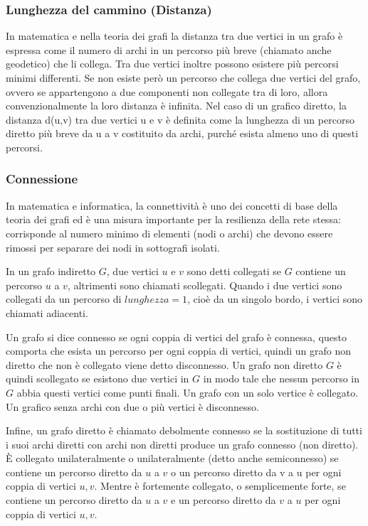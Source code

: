 \documentclass[11pt]{article}
\begin{document}
\subsubsection{Lunghezza del cammino (Distanza)}
In matematica e nella teoria dei grafi la distanza tra due vertici in un grafo è espressa come il numero di archi in un percorso più breve (chiamato anche geodetico) che li collega. \cite{GrafoDistanza}
Tra due vertici inoltre possono esistere più percorsi minimi differenti. Se non esiste però un percorso che collega due vertici del grafo, ovvero se appartengono a due componenti non collegate tra di loro, allora convenzionalmente la loro distanza è infinita.
Nel caso di un grafico diretto, la distanza d(u,v) tra due vertici u e v è definita come la lunghezza di un percorso diretto più breve da u a v costituito da archi, purché esista almeno uno di questi percorsi.

\subsubsection{Connessione}
In matematica e informatica, la connettività è uno dei concetti di base della teoria dei grafi ed è una misura importante per la resilienza della rete stessa: 
corrisponde al numero minimo di elementi (nodi o archi) che devono essere rimossi per separare dei nodi in sottografi isolati. \cite{GrafoConnettivita}

In un grafo indiretto $G$, due vertici $u$ e $v$ sono detti collegati se $G$ contiene un percorso $u$ a $v$, altrimenti sono chiamati scollegati. Quando i due vertici sono collegati da un percorso di $lunghezza = 1$, cioè da un singolo bordo, i vertici sono chiamati adiacenti.

Un grafo si dice connesso se ogni coppia di vertici del grafo è connessa, questo comporta che esista un percorso per ogni coppia di vertici, quindi un grafo non diretto che non è collegato viene detto disconnesso. Un grafo non diretto $G$ è quindi scollegato se esistono due vertici in $G$ in modo tale che nessun percorso in $G$ abbia questi vertici come punti finali. Un grafo con un solo vertice è collegato. Un grafico senza archi con due o più vertici è disconnesso.

Infine, un grafo diretto è chiamato debolmente connesso se la sostituzione di tutti i suoi archi diretti con archi non diretti produce un grafo connesso (non diretto). È collegato unilateralmente o unilateralmente (detto anche semiconnesso) se contiene un percorso diretto da $u$ a $v$ o un percorso diretto da v a u per ogni coppia di vertici $u, v$. Mentre è fortemente collegato, o semplicemente forte, se contiene un percorso diretto da $u$ a $v$ e un percorso diretto da $v$ a $u$ per ogni coppia di vertici $u, v$.
\end{document}

